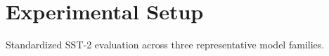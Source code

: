 \section{Experimental Setup}Standardized SST-2 evaluation across three representative model families.
